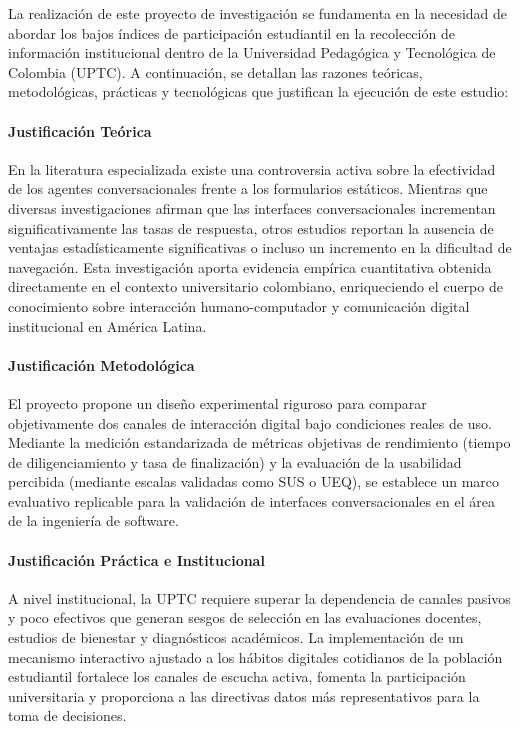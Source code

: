 \documentclass[12pt,letterpaper]{article}
\begin{document}
La realización de este proyecto de investigación se fundamenta en la necesidad de abordar los bajos índices de participación estudiantil en la recolección de información institucional dentro de la Universidad Pedagógica y Tecnológica de Colombia (UPTC). A continuación, se detallan las razones teóricas, metodológicas, prácticas y tecnológicas que justifican la ejecución de este estudio:
\paragraph{Justificación Teórica}
En la literatura especializada existe una controversia activa sobre la efectividad de los agentes conversacionales frente a los formularios estáticos. Mientras que diversas investigaciones afirman que las interfaces conversacionales incrementan significativamente las tasas de respuesta, otros estudios reportan la ausencia de ventajas estadísticamente significativas o incluso un incremento en la dificultad de navegación. Esta investigación aporta evidencia empírica cuantitativa obtenida directamente en el contexto universitario colombiano, enriqueciendo el cuerpo de conocimiento sobre interacción humano-computador y comunicación digital institucional en América Latina.

\paragraph{Justificación Metodológica}
El proyecto propone un diseño experimental riguroso para comparar objetivamente dos canales de interacción digital bajo condiciones reales de uso. Mediante la medición estandarizada de métricas objetivas de rendimiento (tiempo de diligenciamiento y tasa de finalización) y la evaluación de la usabilidad percibida (mediante escalas validadas como SUS o UEQ), se establece un marco evaluativo replicable para la validación de interfaces conversacionales en el área de la ingeniería de software.

\paragraph{Justificación Práctica e Institucional}
A nivel institucional, la UPTC requiere superar la dependencia de canales pasivos y poco efectivos que generan sesgos de selección en las evaluaciones docentes, estudios de bienestar y diagnósticos académicos. La implementación de un mecanismo interactivo ajustado a los hábitos digitales cotidianos de la población estudiantil fortalece los canales de escucha activa, fomenta la participación universitaria y proporciona a las directivas datos más representativos para la toma de decisiones.
\end{document}
